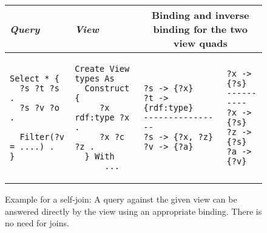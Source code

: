 \documentclass[a4paper,twoside,bibtotoc,abstracton,12pt,BCOR=15mm]{scrreprt}
\begin{document}
\begin{figure}[!h]
\centering
\begin{tabular}{llll}
\toprule
\emph{Query} & \emph{View} & \multicolumn{2}{c}{Binding and inverse binding for the two view quads} \\ 
\midrule

\begin{minipage}{3cm}
\begin{scriptsize}
\begin{verbatim}
Select * {
  ?s ?t ?s .
  ?s ?v ?o .
  
  Filter(?v = ....) .
}
\end{verbatim}
\end{scriptsize}
\end{minipage}

&

\begin{minipage}{3cm}
\begin{scriptsize}
\begin{verbatim}
Create View types As
  Construct {
     ?x rdf:type ?x .
     ?x ?c ?z .
  } With
      ...
\end{verbatim}
\end{scriptsize}
\end{minipage}

&

\begin{minipage}{3cm}
\begin{scriptsize}
\begin{verbatim}
?s -> {?x}
?t -> {rdf:type}
----------------
?s -> {?x, ?z}
?v -> {?a}
\end{verbatim}
\end{scriptsize}
\end{minipage}

&

\begin{minipage}{3cm}
\begin{scriptsize}
\begin{verbatim}
?x -> {?s}
----------
?x -> {?s}
?z -> {?s}
?a -> {?v}
\end{verbatim}
\end{scriptsize}
\end{minipage}

\\

\bottomrule
\end{tabular}
\caption{Example for a self-join: A query against the given view can be answered directly by the view using an appropriate binding. There is no need for joins.}
\label{fig:running-example}
\end{figure}
\end{document}
